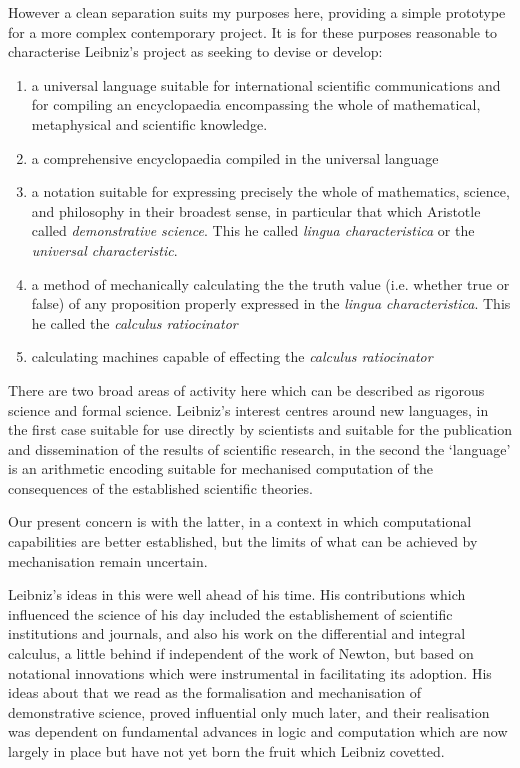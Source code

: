 However a clean separation suits my purposes here, providing a simple prototype
for a more complex contemporary project.
It is for these purposes reasonable to characterise Leibniz's project as seeking
to devise or develop:

\begin{enumerate}
\item a universal language suitable for international scientific communications and for
compiling an encyclopaedia encompassing the whole of mathematical,
metaphysical and scientific knowledge.
\item a comprehensive encyclopaedia compiled in the universal language
\item a notation suitable for expressing precisely the whole of mathematics, science,
and philosophy in their broadest sense, in particular that which Aristotle called
\emph{demonstrative science}.
This he called \emph{lingua characteristica} or the {\it universal characteristic}.
\item a method of mechanically calculating the the truth value (i.e. whether true or false) of any proposition properly expressed in the \emph{lingua characteristica}.
  This he called the \emph{calculus ratiocinator}
  \item calculating machines capable of effecting the \emph{calculus ratiocinator}
\end{enumerate}

There are two broad areas of activity here which can be described as rigorous science and formal science.
Leibniz's interest centres around new languages, in the first case suitable for use directly by scientists and suitable for the publication and dissemination of the results of scientific research, in the second the `language' is an arithmetic encoding suitable for mechanised computation of the consequences of the established scientific theories.

Our present concern is with the latter, in a context in which computational capabilities are better established, but the limits of what can be achieved by mechanisation remain uncertain.

Leibniz's ideas in this were well ahead of his time.
His contributions which influenced the science of his day included the establishement of scientific institutions and journals, and also his work on the differential and integral calculus, a little behind if independent of the work of Newton, but based on notational innovations which were instrumental in facilitating its adoption.
His ideas about that we read as the formalisation and mechanisation of demonstrative science, proved influential only much later, and their realisation was dependent on fundamental advances in logic and computation which are now largely in place but have not yet born the fruit which Leibniz covetted.


